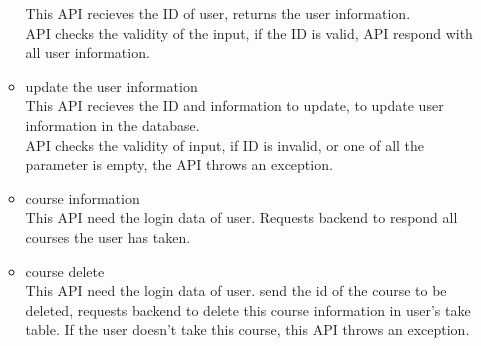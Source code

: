 \documentclass[16pt]{scrreprt}
\begin{document}
\begin{itemize}
\begin{itemize}
                This API recieves the ID of user, returns the user information.\\
                API checks the validity of the input, if the ID is valid, API respond with all user information.
            \item update the user information\\
                This API recieves the ID and information to update, to update user information in the database.\\
                API checks the validity of input, if ID is invalid, or one of all the parameter is empty, the API throws an exception.
            \item course information\\
                This API need the login data of user. Requests backend to respond all courses the user has taken.
            \item course delete\\
                This API need the login data of user. send the id of the course to be deleted, requests backend to delete this course information in user's take table.
                If the user doesn't take this course, this API throws an exception.
        \end{itemize}
\end{itemize}
\end{document}
